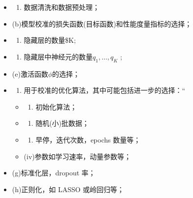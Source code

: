 \documentclass[
]{article}
\providecommand{\tightlist}{%
  \setlength{\itemsep}{0pt}\setlength{\parskip}{0pt}}
\begin{document}
\begin{itemize}
\item
  \begin{enumerate}
  \def\labelenumi{(\alph{enumi})}
  \tightlist
  \item
    数据清洗和数据预处理；
  \end{enumerate}
\item
  (b)模型校准的损失函数(目标函数)和性能度量指标的选择；
\item
  \begin{enumerate}
  \def\labelenumi{(\alph{enumi})}
  \setcounter{enumi}{2}
  \tightlist
  \item
    隐藏层的数量\$K;
  \end{enumerate}
\item
  \begin{enumerate}
  \def\labelenumi{(\alph{enumi})}
  \setcounter{enumi}{3}
  \tightlist
  \item
    隐藏层中神经元的数量\(q_1, \ldots , q_K\) ;
  \end{enumerate}
\item
  (e)激活函数\(\phi\)的选择；
\item
  \begin{enumerate}
  \def\labelenumi{(\alph{enumi})}
  \setcounter{enumi}{5}
  \tightlist
  \item
    用于校准的优化算法，其中可能包括进一步的选择：``
  \end{enumerate}

  \begin{itemize}
  \item
    \begin{enumerate}
    \def\labelenumi{(\roman{enumi})}
    \tightlist
    \item
      初始化算法；
    \end{enumerate}
  \item
    \begin{enumerate}
    \def\labelenumi{(\roman{enumi})}
    \setcounter{enumi}{1}
    \tightlist
    \item
      随机(小)批数据；
    \end{enumerate}
  \item
    \begin{enumerate}
    \def\labelenumi{(\roman{enumi})}
    \setcounter{enumi}{2}
    \tightlist
    \item
      早停，迭代次数，epochs 数量等；
    \end{enumerate}
  \item
    (iv)参数如学习速率，动量参数等；
  \end{itemize}
\item
  (g)标准化层，dropout 率；
\item
  (h)正则化，如 LASSO 或岭回归等；
\end{itemize}
\end{document}
